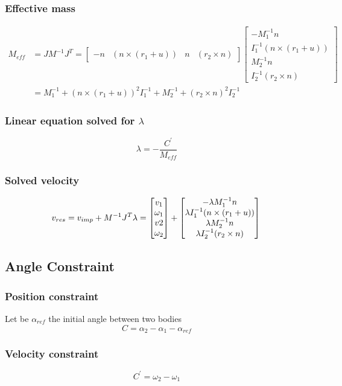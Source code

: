 \documentclass{article}
\begin{document}
		\subsubsection{Effective mass}
		\begin{align}
		M_{eff}
		&=JM^{-1}J^T=
		\begin{bmatrix}
		-n & (n\times(r_1+u)) & n & (r_2\times n)
		\end{bmatrix}
		\begin{bmatrix}
		-M_1^{-1}n\\
		I_1^{-1}(n\times(r_1+u))\\
		M_2^{-1}n\\
		I_2^{-1}(r_2\times n)
		\end{bmatrix}\\
		&=M_1^{-1}+(n\times(r_1+u))^2I_1^{-1}+M_2^{-1}+(r_2\times n)^2I_2^{-1}
		\end{align}
		\subsubsection{Linear equation solved for $\lambda$}
		$$
		\lambda=-\frac{C^{'}}{M_{eff}}
		$$
		\subsubsection{Solved velocity}
		$$
		v_{res}=v_{imp}+M^{-1}J^T\lambda=
		\begin{bmatrix}
		v_1\\
		\omega_1\\
		v2\\
		\omega_2
		\end{bmatrix}
		+
		\begin{bmatrix}
		-\lambda M_1^{-1}n\\
		\lambda I_1^{-1}(n\times(r_1+u))\\
		\lambda M_2^{-1}n\\
		\lambda I_2^{-1}(r_2\times n)
		\end{bmatrix}\\
		$$
		\newpage
	\subsection{Angle Constraint}
	\subsubsection{Position constraint}
	Let be $\alpha_{ref}$ the initial angle between two bodies
		$$
			C=\alpha_2-\alpha_1-\alpha_{ref}
		$$
	\subsubsection{Velocity constraint}
		$$
			C^{'}=\omega_2-\omega_1
		$$
\end{document}
